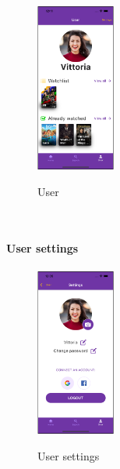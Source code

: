 \documentclass[12pt, a4paper]{article}
\numberwithin{figure}{section}
\begin{document}
\begin{center}
	\begin{figure}[H]
		\centering
		\includegraphics[width=0.23\textwidth]{images/final/user.png}\\
		\caption{User}
	\end{figure}
\end{center}

\mbox{}\\

\paragraph{User settings}

\begin{center}
	\begin{figure}[H]
		\centering
		\includegraphics[width=0.23\textwidth]{images/final/userSetting.png}\\
		\caption{User settings}
	\end{figure}
\end{center}
\end{document}
